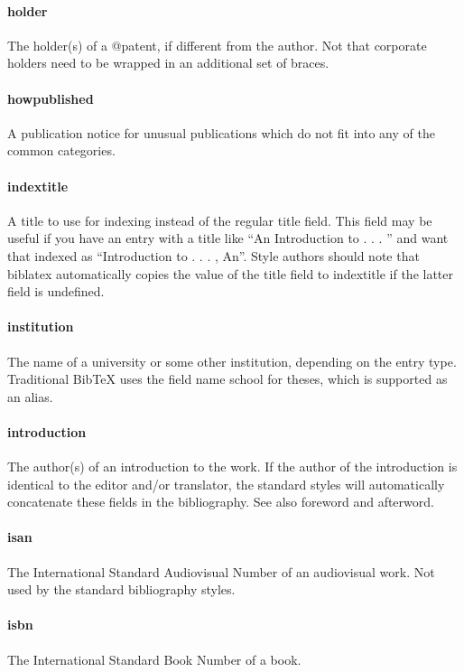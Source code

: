 \documentclass[a4paper,12pt]{report}
\begin{document}
\paragraph{holder}
The holder(s) of a @patent, if different from the author. Not that corporate holders need to
be wrapped in an additional set of braces.

\paragraph{howpublished}
A publication notice for unusual publications which do not fit into any of the common
categories.

\paragraph{indextitle}
A title to use for indexing instead of the regular title field. This field may be useful
if you have an entry with a title like “An Introduction to . . . ” and want that indexed as
“Introduction to . . . , An”. Style authors should note that biblatex automatically copies the
value of the title field to indextitle if the latter field is undefined.

\paragraph{institution}
The name of a university or some other institution, depending on the entry type. Traditional
BibTeX uses the field name school for theses, which is supported as an alias.

\paragraph{introduction}
The author(s) of an introduction to the work. If the author of the introduction is identical
to the editor and/or translator, the standard styles will automatically concatenate these
fields in the bibliography. See also foreword and afterword.

\paragraph{isan}
The International Standard Audiovisual Number of an audiovisual work. Not used by the
standard bibliography styles.

\paragraph{isbn}
The International Standard Book Number of a book.
\end{document}
